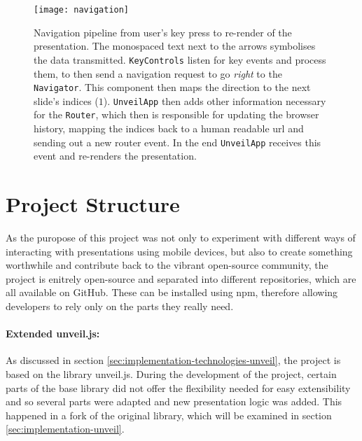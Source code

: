 \begin{figure}
\centering
\texttt{[image: navigation]}
\caption{Navigation pipeline from user's key press to re-render of the presentation. The monospaced text next to the arrows symbolises the data transmitted. \texttt{KeyControls} listen for key events and process them, to then send a navigation request to go \emph{right} to the \texttt{Navigator}. This component then maps the direction to the next slide's indices ($1$). \texttt{UnveilApp} then adds other information necessary for the \texttt{Router}, which then is responsible for updating the browser history, mapping the indices back to a human readable url and sending out a new router event. In the end \texttt{UnveilApp} receives this event and re-renders the presentation.}
\label{fig:implementation-technologies-unveil-navigation}
\end{figure}


\section{Project Structure}
\label{sec:implementation-structure}

As the puropose of this project was not only to experiment with different ways of interacting with presentations using mobile devices, but also to create something worthwhile and contribute back to the vibrant open-source community, the project is enitrely open-source and separated into different repositories, which are all available on GitHub. These can be installed using npm, therefore allowing developers to rely only on the parts they really need.

\paragraph{Extended unveil.js:} As discussed in section \ref{sec:implementation-technologies-unveil}, the project is based on the library unveil.js. During the development of the project, certain parts of the base library did not offer the flexibility needed for easy extensibility and so several parts were adapted and new presentation logic was added. This happened in a fork of the original library, which will be examined in section \ref{sec:implementation-unveil}.

